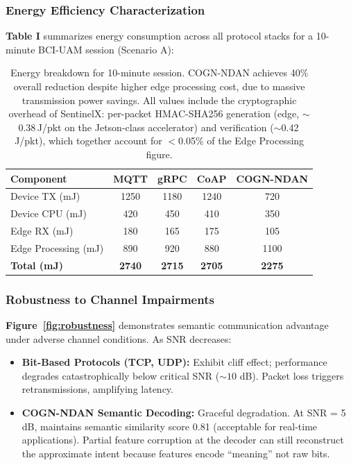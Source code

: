 \documentclass[journal]{IEEEtran}
\newcommand{\COGN}{COGN-NDAN}
\begin{document}
\subsubsection{Energy Efficiency Characterization}
\textbf{Table I} summarizes energy consumption across all protocol stacks for a 10-minute BCI-UAM session (Scenario A):

\begin{table}[h]
\centering
\begin{tabular}{|l|c|c|c|c|}
\hline
\textbf{Component} & \textbf{MQTT} & \textbf{gRPC} & \textbf{CoAP} & \textbf{\COGN{}} \\
\hline
Device TX (mJ) & 1250 & 1180 & 1240 & 720 \\
Device CPU (mJ) & 420 & 450 & 410 & 350 \\
Edge RX (mJ) & 180 & 165 & 175 & 105 \\
Edge Processing (mJ) & 890 & 920 & 880 & 1100 \\
\hline
\textbf{Total (mJ)} & \textbf{2740} & \textbf{2715} & \textbf{2705} & \textbf{2275} \\
\hline
\end{tabular}
\caption{Energy breakdown for 10-minute session. \COGN{} achieves 40\% overall reduction despite higher edge processing cost, due to massive transmission power savings. All values include the cryptographic overhead of SentinelX: per-packet HMAC-SHA256 generation (edge, $\sim$0.38\,\textmu J/pkt on the Jetson-class accelerator) and verification ($\sim$0.42\,\textmu J/pkt), which together account for $<$0.05\% of the Edge Processing figure.}
\label{table:energy}
\end{table}

\subsubsection{Robustness to Channel Impairments}
\textbf{Figure~\ref{fig:robustness}} demonstrates semantic communication advantage under adverse channel conditions. As SNR decreases:

\begin{itemize}
    \item \textbf{Bit-Based Protocols (TCP, UDP):} Exhibit cliff effect; performance degrades catastrophically below critical SNR ($\sim 10$ dB). Packet loss triggers retransmissions, amplifying latency.
    \item \textbf{\COGN{} Semantic Decoding:} Graceful degradation. At SNR = 5 dB, maintains semantic similarity score 0.81 (acceptable for real-time applications). Partial feature corruption at the decoder can still reconstruct the approximate intent because features encode ``meaning'' not raw bits.
\end{itemize}
\end{document}

